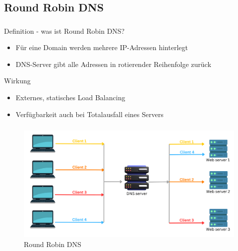 \subsection{Round Robin DNS}
\begin{frame}
    \frametitle{\insertsection}
    \framesubtitle{\insertsubsection}
    \begin{block}{Definition - was ist Round Robin DNS?}
    \begin{itemize}
        \item Für eine Domain werden mehrere IP-Adressen hinterlegt
        \item DNS-Server gibt alle Adressen in rotierender Reihenfolge zurück


    \end{itemize}
    \end{block}
    \begin{block}{Wirkung}
    	\begin{itemize}
    		\item Externes, statisches Load Balancing
    		\item Verfügbarkeit auch bei Totalausfall eines Servers
    	\end{itemize}
    \end{block}
\end{frame}


\begin{frame}
    \frametitle{\insertsection}
    \framesubtitle{\insertsubsection}

	\vspace*{-12pt}
    \begin{figure}[h]
        \centering
        \captionsetup{aboveskip=0pt}
        \includegraphics[width=.7\textwidth]{../images/roundrobindns}
        \caption{Round Robin DNS~\cite{cloudns-roundrobin}}
    \end{figure}
\end{frame}

